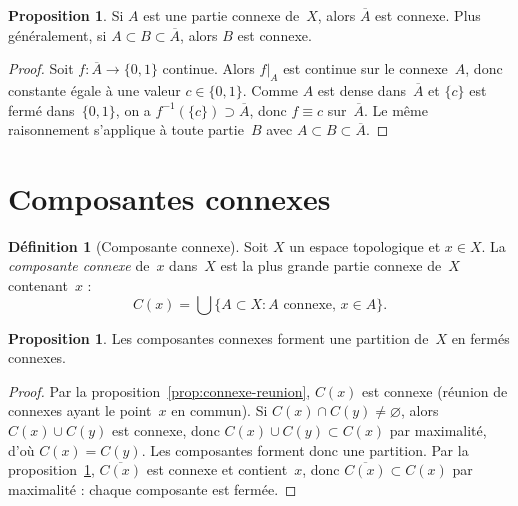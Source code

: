 \documentclass[12pt,a4paper,openany]{book}
\theoremstyle{definition}
\newtheorem{definition}{Définition}[chapter]
\theoremstyle{cours}
\newtheorem{proposition}[theoreme]{Proposition}
\theoremstyle{coursnormal}
\begin{document}
\begin{proposition}
\label{prop:adherence-connexe}
Si $A$ est une partie connexe de~$X$, alors $\overline{A}$ est connexe.
Plus généralement, si $A \subset B \subset \overline{A}$, alors $B$ est connexe.
\end{proposition}

\begin{proof}
Soit $f \colon \overline{A} \to \{0,1\}$ continue. Alors $f|_A$ est continue sur
le connexe~$A$, donc constante égale à une valeur $c \in \{0,1\}$. Comme $A$ est
dense dans~$\overline{A}$ et $\{c\}$ est fermé dans~$\{0,1\}$, on a
$f^{-1}(\{c\}) \supset \overline{A}$, donc $f \equiv c$ sur~$\overline{A}$.
Le même raisonnement s'applique à toute partie~$B$ avec $A \subset B \subset \overline{A}$.
\end{proof}

\section{Composantes connexes}
\label{sec:composantes-connexes}

\begin{definition}[Composante connexe]
\label{def:composante-connexe}
Soit $X$ un espace topologique et $x \in X$. La \emph{composante connexe}
de~$x$ dans~$X$ est la plus grande partie connexe de~$X$ contenant~$x$ :
\[
C(x) = \bigcup \{ A \subset X : A \text{ connexe}, \, x \in A \}.
\]
\end{definition}

\begin{proposition}
\label{prop:partition-composantes}
Les composantes connexes forment une partition de~$X$ en fermés connexes.
\end{proposition}

\begin{proof}
Par la proposition~\ref{prop:connexe-reunion}, $C(x)$ est connexe (réunion de
connexes ayant le point~$x$ en commun). Si $C(x) \cap C(y) \neq \varnothing$,
alors $C(x) \cup C(y)$ est connexe, donc $C(x) \cup C(y) \subset C(x)$ par
maximalité, d'où $C(x) = C(y)$. Les composantes forment donc une partition.
Par la proposition~\ref{prop:adherence-connexe}, $\overline{C(x)}$ est connexe et
contient~$x$, donc $\overline{C(x)} \subset C(x)$ par maximalité : chaque
composante est fermée.
\end{proof}
\end{document}
